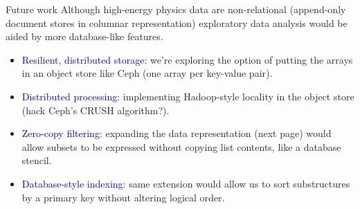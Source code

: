 \documentclass[aspectratio=169]{beamer}
\begin{document}
\begin{frame}{Future work}
\vspace{0.35 cm}
\large
Although high-energy physics data are non-relational (append-only document stores in columnar representation) exploratory data analysis would be aided by more database-like features.

\begin{itemize}\setlength{\itemsep}{0.2 cm}
\item<2-> \textcolor{darkblue}{Resilient, distributed storage:} we're exploring the option of putting the arrays in an object store like Ceph (one array per key-value pair).
\item<3-> \textcolor{darkblue}{Distributed processing:} implementing Hadoop-style locality in the object store (hack Ceph's CRUSH algorithm?).
\item<4-> \textcolor{darkblue}{Zero-copy filtering:} expanding the data representation (next page) would allow subsets to be expressed without copying list contents, like a database stencil.
\item<5-> \textcolor{darkblue}{Database-style indexing:} same extension would allow us to sort substructures by a primary key without altering logical order.
\end{itemize}
\end{frame}
\end{document}
